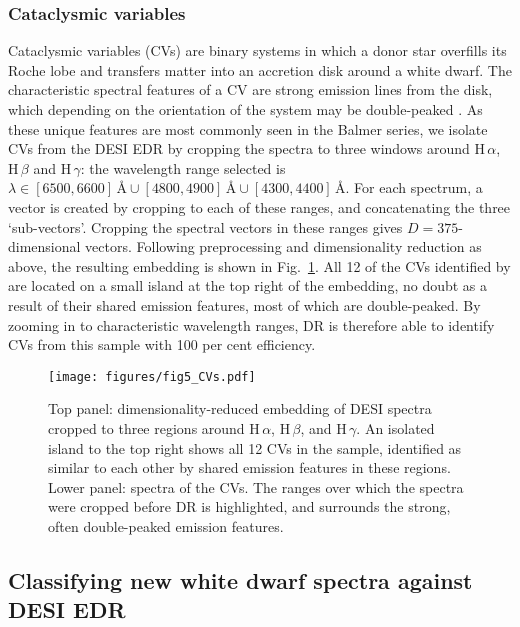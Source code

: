 \documentclass[fleqn,usenatbib]{mnras}
\begin{document}
\subsubsection{Cataclysmic variables}
\label{sec:CVs}

Cataclysmic variables (CVs) are binary systems in which a donor star overfills its Roche lobe and transfers matter into an accretion disk around a white dwarf.
The characteristic spectral features of a CV are strong emission lines from the disk, which depending on the orientation of the system may be double-peaked \citep{smak69, huang72}.
As these unique features are most commonly seen in the Balmer series, we isolate CVs from the DESI EDR by cropping the spectra to three windows around H$\,\alpha$, H$\,\beta$ and H$\,\gamma$:
the wavelength range selected is $\lambda \in [6500, 6600]\,\text{\AA} \cup [4800, 4900]\,\text{\AA} \cup [4300, 4400]\,\text{\AA}$.
For each spectrum, a vector is created by cropping to each of these ranges, and concatenating the three `sub-vectors'.
Cropping the spectral vectors in these ranges gives $D=375$-dimensional vectors.
Following preprocessing and dimensionality reduction as above, the resulting embedding is shown in Fig.~\ref{fig:CVs}.
All 12 of the CVs identified by \citet{manser24} are located on a small island at the top right of the embedding, no doubt as a result of their shared emission features, most of which are double-peaked.
By zooming in to characteristic wavelength ranges, DR is therefore able to identify CVs from this sample with 100 per cent efficiency.

\begin{figure}
\centering
\texttt{[image: figures/fig5\_CVs.pdf]}
\caption{
    Top panel: dimensionality-reduced embedding of DESI spectra cropped to three regions around H\,$\alpha$, H\,$\beta$, and H\,$\gamma$.
    An isolated island to the top right shows all 12 CVs in the sample, identified as similar to each other by shared emission features in these regions.
    Lower panel: spectra of the CVs.
    The ranges over which the spectra were cropped before DR is highlighted, and surrounds the strong, often double-peaked emission features.
}
\label{fig:CVs}
\end{figure}


\subsection{Classifying new white dwarf spectra against DESI EDR}
\end{document}
